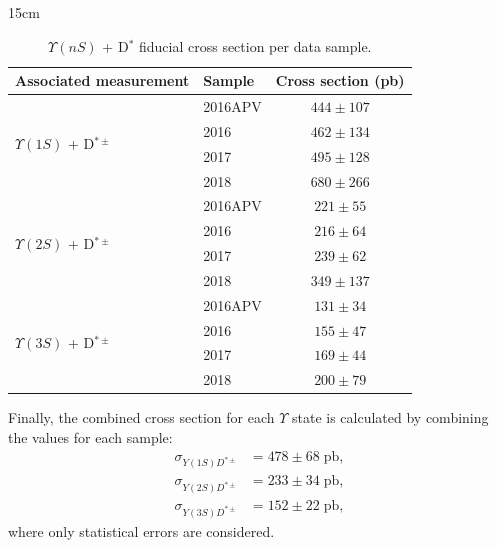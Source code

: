 \begin{table}[!htbp]{15cm}
  \caption{$\Upsilon(nS)$ + D$^{*}$ fiducial cross section per data sample.}
  \begin{tabular}{ l | l | c }
    \hline
    Associated measurement & Sample  & Cross section (pb)           \\ \hline
    \multirow[c]{4}{*}{$\Upsilon(1S)$ + D$^{*\pm}$}
                           & 2016APV & $444 \pm 107$ \bigstrut \\\cline{2-3}
                           & 2016    & $462 \pm 134$ \bigstrut \\\cline{2-3}
                           & 2017    & $495 \pm 128$ \bigstrut \\\cline{2-3}
                           & 2018    & $680 \pm 266$          \\ \hline
    \multirow[c]{4}{*}{$\Upsilon(2S)$ + D$^{*\pm}$}
                           & 2016APV & $221 \pm 55$ \bigstrut  \\\cline{2-3}
                           & 2016    & $216 \pm 64$ \bigstrut  \\\cline{2-3}
                           & 2017    & $239 \pm 62$ \bigstrut  \\\cline{2-3}
                           & 2018    & $349 \pm 137$          \\ \hline
    \multirow[c]{4}{*}{$\Upsilon(3S)$ + D$^{*\pm}$}
                           & 2016APV & $131 \pm 34$ \bigstrut  \\\cline{2-3}
                           & 2016    & $155 \pm 47$ \bigstrut  \\\cline{2-3}
                           & 2017    & $169 \pm 44$ \bigstrut  \\\cline{2-3}
                           & 2018    & $200 \pm 79$            \\ \hline
  \end{tabular}
  \label{tab:DPS_xsec}
\end{table}

Finally, the combined cross section for each $\Upsilon$ state is calculated by combining the values for each sample:
\begin{equation}
  \begin{split}
    \sigma_{Y(1S)D^{*\pm}} &= 478 \pm 68 \; \text{pb},\\
    \sigma_{Y(2S)D^{*\pm}} &= 233 \pm 34 \; \text{pb},\\
    \sigma_{Y(3S)D^{*\pm}} &= 152 \pm 22 \; \text{pb},
  \end{split}
\end{equation}
where only statistical errors are considered.

